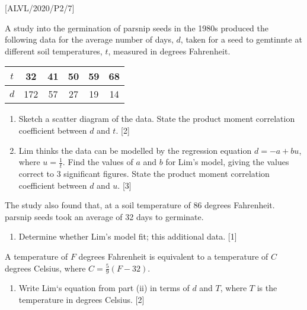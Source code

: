 \item {[}ALVL/2020/P2/7{]}

A study into the germination of parsnip seeds in the 1980s produced
the following data for the average number of days, $d$, taken for
a seed to gemtinnte at different soil temperatures, $t$, measured
in degrees Fahrenheit.
\noindent \begin{center}
\begin{tabular}{|c|c|c|c|c|c|}
\hline 
$t$ & 32 & 41 & 50 & 59 & 68\tabularnewline
\hline 
$d$ & 172 & 57 & 27 & 19 & 14\tabularnewline
\hline 
\end{tabular}
\par\end{center}
\begin{enumerate}
\item Sketch a scatter diagram of the data. State the product moment correlation
coefficient between $d$ and $t$. \hfill{}{[}2{]}
\item Lim thinks the data can be modelled by the regression equation $d=-a+bu$,
where $u=\frac{1}{t}$. Find the values of $a$ and $b$ for Lim's
model, giving the values correct to 3 significant figures. State the
product moment correlation coefficient between $d$ and $u$. \hfill{}{[}3{]}
\end{enumerate}
The study also found that, at a soil temperature of 86 degrees Fahrenheit.
parsnip seeds took an average of 32 days to germinate.
\begin{enumerate}
\item Determine whether Lim's model fit; this additional data.\hfill{}
{[}1{]}
\end{enumerate}
A temperature of $F$ degrees Fahrenheit is equivalent to a temperature
of $C$ degrees Celsius, where $C=\frac{5}{9}\left(F-32\right)$.
\begin{enumerate}
\item Write Lim\textquoteleft s equation from part (ii) in terms of $d$
and $T$, where $T$ is the temperature in degrees Celsius.\hfill{}
{[}2{]}
\end{enumerate}
